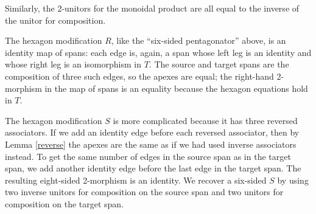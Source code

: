 \documentclass[12pt,twoside,openright]{report}
\begin{document}
\begin{center}
\end{center}

Similarly, the 2-unitors for the monoidal product are all equal to the inverse of the unitor for composition.

\begin{center}
\end{center}

The hexagon modification $R$, like the ``six-sided pentagonator'' above, is an identity map of spans: each edge is, again, a span whose left leg is an identity and whose right leg is an isomorphism in $T$.  The source and target spans are the composition of three such edges, so the apexes are equal; the right-hand 2-morphism in the map of spans is an equality because the hexagon equations hold in $T.$

The hexagon modification $S$ is more complicated because it has three reversed associators.  If we add an identity edge before each reversed associator, then by Lemma \ref{reverse} the apexes are the same as if we had used inverse associators instead.  To get the same number of edges in the source span as in the target span, we add another identity edge before the last edge in the target span.  The resulting eight-sided 2-morphism is an identity.  We recover a six-sided $S$ by using two inverse unitors for composition on the source span and two unitors for composition on the target span.
\end{document}
